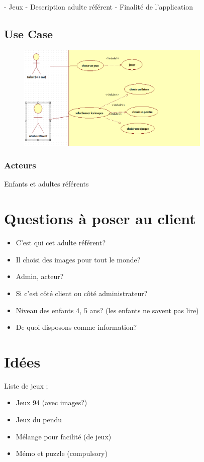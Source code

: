 \documentclass[12pt,a4paper]{report}
\begin{document}
- Jeux
- Description adulte référent
- Finalité de l'application


\section{Use Case}
\begin{figure}[!h]
 \centering
 \includegraphics[width=350px]{uml.png}
\end{figure}

\subsection{Acteurs}
Enfants et adultes référents

\chapter{Questions à poser au client}

\begin{itemize}
\item C'est qui cet adulte référent? 
\item Il choisi des images pour tout le monde?
\item Admin, acteur? 
\item Si c'est côté client ou côté administrateur? 
\item Niveau des enfants 4, 5 ans? (les enfants ne savent pas lire)
\item De quoi disposons comme information?
\end{itemize}

\chapter{Idées}

Liste de jeux ;
\begin{itemize}
\item Jeux 94 (avec images?)
\item Jeux du pendu
\item Mélange pour facilité (de jeux)
\item Mémo et puzzle (compulsory)
\end{itemize}
\end{document}
